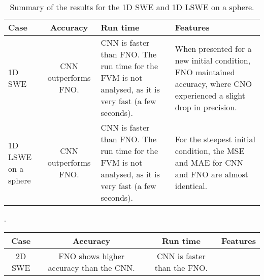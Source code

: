

\begin{table}[H]
    \centering
    \begin{tabular}{|p{2cm}|c|p{3.3cm}|p{6.2cm}|}
        \hline
        \textbf{Case}  & \textbf{Accuracy} & \textbf{Run time} & \textbf{Features}  \\ \hline
        1D SWE & CNN outperforms FNO. & CNN is faster than FNO. The run time for the FVM is not analysed, as it is very fast (a few seconds). & When presented for a new initial condition, FNO maintained accuracy, where CNO experienced a slight drop in precision. \\ \hline
        1D LSWE on a sphere & CNN outperforms FNO. & CNN is faster than FNO. The run time for the FVM is not analysed, as it is very fast (a few seconds). & For the steepest initial condition, the MSE and MAE for CNN and FNO are almost identical. \\ \hline
    \end{tabular}
    \caption{Summary of the results for the 1D SWE and 1D LSWE on a sphere.} \label{tab:summary_1D}
\end{table}

\begin{table}[H]. 
    \centering
    \begin{tabular}{|c|c|c|p{6.5cm}|}
        \hline
        \textbf{Case}  & \textbf{Accuracy} & \textbf{Run time} & \textbf{Features}  \\ \hline
        2D SWE & FNO shows higher accuracy than the CNN. & CNN is faster than the FNO. 
    \end{tabular}
\end{table}








